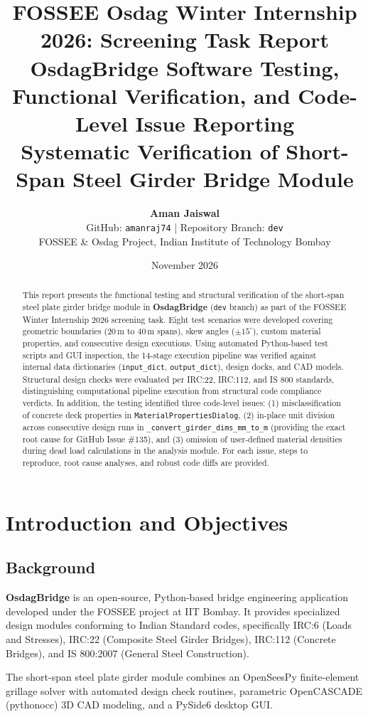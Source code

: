 \documentclass[11pt,a4paper]{article}
\title{
    \vspace{-1.5cm}
    \textbf{\Large FOSSEE Osdag Winter Internship 2026: Screening Task Report} \\[0.4cm]
    \textbf{\LARGE OsdagBridge Software Testing, Functional Verification, and Code-Level Issue Reporting} \\[0.3cm]
    \large Systematic Verification of Short-Span Steel Girder Bridge Module
}
\author{
    \textbf{Aman Jaiswal} \\
    GitHub: \texttt{amanraj74} \quad | \quad Repository Branch: \texttt{dev} \\
    FOSSEE \& Osdag Project, Indian Institute of Technology Bombay
}
\date{November 2026}
\begin{document}
\maketitle

\begin{abstract}
This report presents the functional testing and structural verification of the short-span steel plate girder bridge module in \textbf{OsdagBridge} (\texttt{dev} branch) as part of the FOSSEE Winter Internship 2026 screening task. Eight test scenarios were developed covering geometric boundaries (20\,m to 40\,m spans), skew angles ($\pm 15^\circ$), custom material properties, and consecutive design executions. Using automated Python-based test scripts and GUI inspection, the 14-stage execution pipeline was verified against internal data dictionaries (\texttt{input\_dict}, \texttt{output\_dict}), design docks, and CAD models. Structural design checks were evaluated per IRC:22, IRC:112, and IS 800 standards, distinguishing computational pipeline execution from structural code compliance verdicts. In addition, the testing identified three code-level issues: (1) misclassification of concrete deck properties in \texttt{MaterialPropertiesDialog}, (2) in-place unit division across consecutive design runs in \texttt{\_convert\_girder\_dims\_mm\_to\_m} (providing the exact root cause for GitHub Issue \#135), and (3) omission of user-defined material densities during dead load calculations in the analysis module. For each issue, steps to reproduce, root cause analyses, and robust code diffs are provided.
\end{abstract}

\tableofcontents
\newpage

\section{Introduction and Objectives}

\subsection{Background}
\textbf{OsdagBridge} is an open-source, Python-based bridge engineering application developed under the FOSSEE project at IIT Bombay. It provides specialized design modules conforming to Indian Standard codes, specifically IRC:6 (Loads and Stresses), IRC:22 (Composite Steel Girder Bridges), IRC:112 (Concrete Bridges), and IS 800:2007 (General Steel Construction). 

The short-span steel plate girder module combines an OpenSeesPy finite-element grillage solver with automated design check routines, parametric OpenCASCADE (pythonocc) 3D CAD modeling, and a PySide6 desktop GUI.
\end{document}
